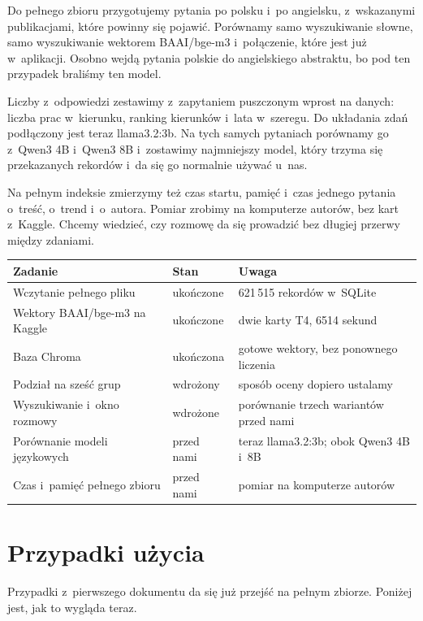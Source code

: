 \documentclass[11pt,a4paper]{article}
\begin{document}
Do pełnego zbioru przygotujemy pytania po polsku i~po angielsku, z~wskazanymi publikacjami, które powinny się pojawić. Porównamy samo wyszukiwanie słowne, samo wyszukiwanie wektorem BAAI/bge-m3 i~połączenie, które jest już w~aplikacji. Osobno wejdą pytania polskie do angielskiego abstraktu, bo pod ten przypadek braliśmy ten model.

Liczby z~odpowiedzi zestawimy z~zapytaniem puszczonym wprost na danych: liczba prac w~kierunku, ranking kierunków i~lata w~szeregu. Do układania zdań podłączony jest teraz llama3.2:3b. Na tych samych pytaniach porównamy go z~Qwen3 4B i~Qwen3 8B i~zostawimy najmniejszy model, który trzyma się przekazanych rekordów i~da się go normalnie używać u~nas.

Na pełnym indeksie zmierzymy też czas startu, pamięć i~czas jednego pytania o~treść, o~trend i~o~autora. Pomiar zrobimy na komputerze autorów, bez kart z~Kaggle. Chcemy wiedzieć, czy rozmowę da się prowadzić bez długiej przerwy między zdaniami.

\begin{center}
\begin{tabularx}{\textwidth}{|L{0.36\textwidth}|L{0.20\textwidth}|Y|}
\hline
\textbf{Zadanie} & \textbf{Stan} & \textbf{Uwaga} \\
\hline
Wczytanie pełnego pliku & ukończone & 621\,515 rekordów w~SQLite \\
\hline
Wektory BAAI/bge-m3 na Kaggle & ukończone & dwie karty T4, 6514 sekund \\
\hline
Baza Chroma & ukończona & gotowe wektory, bez ponownego liczenia \\
\hline
Podział na sześć grup & wdrożony & sposób oceny dopiero ustalamy \\
\hline
Wyszukiwanie i~okno rozmowy & wdrożone & porównanie trzech wariantów przed nami \\
\hline
Porównanie modeli językowych & przed nami & teraz llama3.2:3b; obok Qwen3 4B i~8B \\
\hline
Czas i~pamięć pełnego zbioru & przed nami & pomiar na komputerze autorów \\
\hline
\end{tabularx}
\end{center}

\section*{Przypadki użycia}

Przypadki z~pierwszego dokumentu da się już przejść na pełnym zbiorze. Poniżej jest, jak to wygląda teraz.
\end{document}
